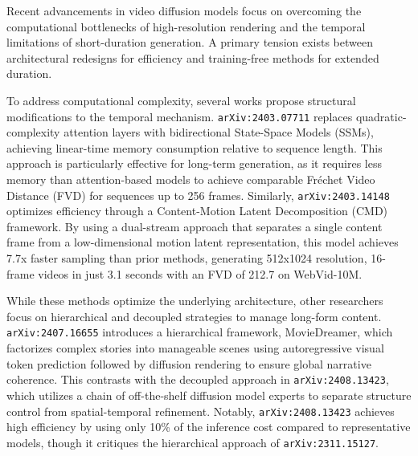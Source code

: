 \documentclass[11pt]{article}
\begin{document}
Recent advancements in video diffusion models focus on overcoming the computational bottlenecks of high-resolution rendering and the temporal limitations of short-duration generation. A primary tension exists between architectural redesigns for efficiency and training-free methods for extended duration.

To address computational complexity, several works propose structural modifications to the temporal mechanism. \texttt{arXiv:2403.07711} replaces quadratic-complexity attention layers with bidirectional State-Space Models (SSMs), achieving linear-time memory consumption relative to sequence length. This approach is particularly effective for long-term generation, as it requires less memory than attention-based models to achieve comparable Fréchet Video Distance (FVD) for sequences up to 256 frames. Similarly, \texttt{arXiv:2403.14148} optimizes efficiency through a Content-Motion Latent Decomposition (CMD) framework. By using a dual-stream approach that separates a single content frame from a low-dimensional motion latent representation, this model achieves 7.7x faster sampling than prior methods, generating 512x1024 resolution, 16-frame videos in just 3.1 seconds with an FVD of 212.7 on WebVid-10M.

While these methods optimize the underlying architecture, other researchers focus on hierarchical and decoupled strategies to manage long-form content. \texttt{arXiv:2407.16655} introduces a hierarchical framework, MovieDreamer, which factorizes complex stories into manageable scenes using autoregressive visual token prediction followed by diffusion rendering to ensure global narrative coherence. This contrasts with the decoupled approach in \texttt{arXiv:2408.13423}, which utilizes a chain of off-the-shelf diffusion model experts to separate structure control from spatial-temporal refinement. Notably, \texttt{arXiv:2408.13423} achieves high efficiency by using only 10\% of the inference cost compared to representative models, though it critiques the hierarchical approach of \texttt{arXiv:2311.15127}.
\end{document}
